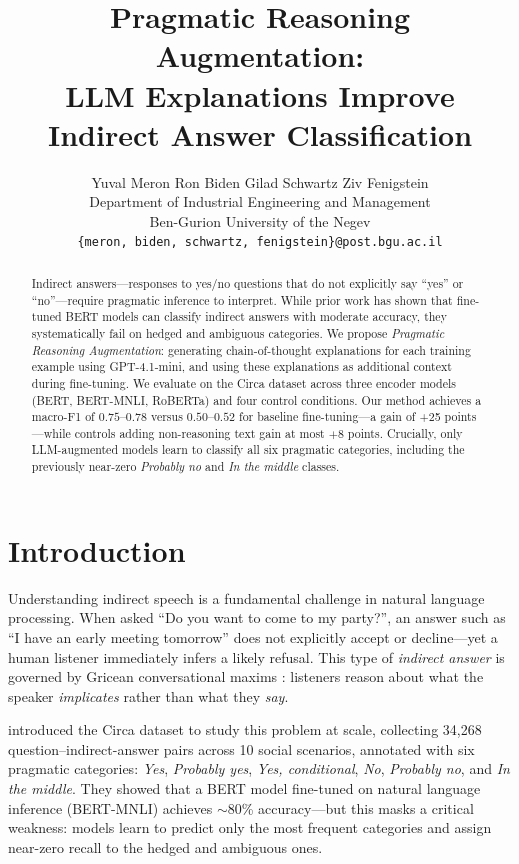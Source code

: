 \documentclass[11pt,a4paper]{article}
\title{\textbf{Pragmatic Reasoning Augmentation:\\
LLM Explanations Improve Indirect Answer Classification}}
\author{
  Yuval Meron \quad Ron Biden \quad Gilad Schwartz \quad Ziv Fenigstein \\
  Department of Industrial Engineering and Management \\
  Ben-Gurion University of the Negev \\
  \texttt{\{meron, biden, schwartz, fenigstein\}@post.bgu.ac.il}
}
\date{}
\begin{document}
\maketitle

\begin{abstract}
Indirect answers---responses to yes/no questions that do not explicitly say ``yes'' or ``no''---require pragmatic inference to interpret. While prior work has shown that fine-tuned BERT models can classify indirect answers with moderate accuracy, they systematically fail on hedged and ambiguous categories. We propose \textit{Pragmatic Reasoning Augmentation}: generating chain-of-thought explanations for each training example using GPT-4.1-mini, and using these explanations as additional context during fine-tuning. We evaluate on the Circa dataset across three encoder models (BERT, BERT-MNLI, RoBERTa) and four control conditions. Our method achieves a macro-F1 of $0.75$--$0.78$ versus $0.50$--$0.52$ for baseline fine-tuning---a gain of +25 points---while controls adding non-reasoning text gain at most $+8$ points. Crucially, only LLM-augmented models learn to classify all six pragmatic categories, including the previously near-zero \textit{Probably no} and \textit{In the middle} classes.
\end{abstract}

\section{Introduction}

Understanding indirect speech is a fundamental challenge in natural language processing. When asked ``Do you want to come to my party?'', an answer such as ``I have an early meeting tomorrow'' does not explicitly accept or decline---yet a human listener immediately infers a likely refusal. This type of \textit{indirect answer} is governed by Gricean conversational maxims \citep{grice1975logic}: listeners reason about what the speaker \textit{implicates} rather than what they \textit{say}.

\citet{louis2020} introduced the Circa dataset to study this problem at scale, collecting 34,268 question--indirect-answer pairs across 10 social scenarios, annotated with six pragmatic categories: \textit{Yes}, \textit{Probably yes}, \textit{Yes, conditional}, \textit{No}, \textit{Probably no}, and \textit{In the middle}. They showed that a BERT model fine-tuned on natural language inference (BERT-MNLI) achieves $\sim$80\% accuracy---but this masks a critical weakness: models learn to predict only the most frequent categories and assign near-zero recall to the hedged and ambiguous ones.
\end{document}
